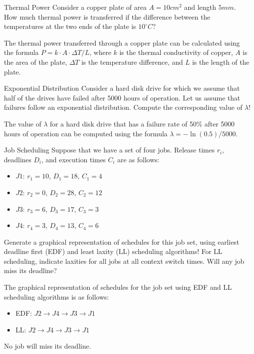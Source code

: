 \documentclass{article}
\begin{document}
\begin{exercise}{Thermal Power}
  Consider a copper plate of area $A=10cm^2$ and length $5mm$. How much thermal power is transferred if the difference between the temperatures at the two ends of the plate is $10^\circ C$?

  \begin{solution}
    The thermal power transferred through a copper plate can be calculated using the formula $P = k \cdot A \cdot \Delta T / L$, where $k$ is the thermal conductivity of copper, $A$ is the area of the plate, $\Delta T$ is the temperature difference, and $L$ is the length of the plate.
  \end{solution}
\end{exercise}

\begin{exercise}{Exponential Distribution}
  Consider a hard disk drive for which we assume that half of the drives have failed after 5000 hours of operation. Let us assume that failures follow an exponential distribution. Compute the corresponding value of $\lambda$!

  \begin{solution}
    The value of $\lambda$ for a hard disk drive that has a failure rate of 50\% after 5000 hours of operation can be computed using the formula $\lambda = -\ln(0.5) / 5000$.
  \end{solution}
\end{exercise}

\begin{exercise}{Job Scheduling}
  Suppose that we have a set of four jobs. Release times $r_i$, deadlines $D_i$, and execution times $C_i$ are as follows:
  \begin{itemize}
    \item $J1$: $r_1=10$, $D_1=18$, $C_1=4$
    \item $J2$: $r_2=0$, $D_2=28$, $C_2=12$
    \item $J3$: $r_3=6$, $D_3=17$, $C_3=3$
    \item $J4$: $r_4=3$, $D_4=13$, $C_4=6$
  \end{itemize}
  Generate a graphical representation of schedules for this job set, using earliest deadline first (EDF) and least laxity (LL) scheduling algorithms! For LL scheduling, indicate laxities for all jobs at all context switch times. Will any job miss its deadline?

  \begin{solution}
    The graphical representation of schedules for the job set using EDF and LL scheduling algorithms is as follows:
    \begin{itemize}
      \item EDF: $J2 \rightarrow J4 \rightarrow J3 \rightarrow J1$
      \item LL: $J2 \rightarrow J4 \rightarrow J3 \rightarrow J1$
    \end{itemize}
    No job will miss its deadline.
  \end{solution}
\end{exercise}
\end{document}
